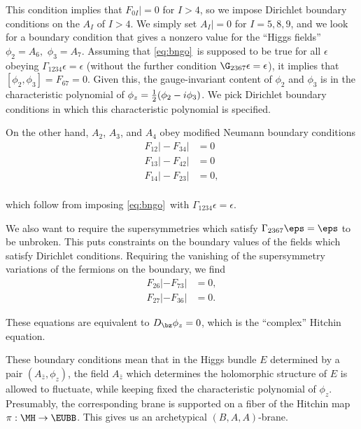 This condition implies that $F_{0I}|=0$ for $I>4$, so we impose
Dirichlet boundary conditions on the $A_I$ of $I>4$.  We simply
set $A_I\vert=0$ for $I=5,8,9$, and we look for a boundary
condition that gives a nonzero value for the ``Higgs fields''
$\phi_2=A_6,$ $\phi_3=A_7$.  Assuming that \eqref{eq:bngo}\ is supposed to
be true for all $\epsilon$ obeying
$\Gamma_{1234}\epsilon=\epsilon$ (without the further condition
$\G_{2367}\epsilon=\epsilon$), it implies that
$[\phi_2,\phi_3]=F_{67}=0$.  Given this, the gauge-invariant
content of $\phi_2$ and $\phi_3$ is in the characteristic
polynomial of $\phi_z={1\over 2}(\phi_2-i\phi_3)$.   We pick
Dirichlet boundary conditions in which this characteristic
polynomial is specified.

On the other hand, $A_{2}$, $A_{3}$, and $A_{4}$ obey modified
Neumann boundary conditions %
\setcounter{equation}{24}
\begin{equation}\label{eq:yimgo}
\begin{aligned} F_{12}\vert -
F_{34}\vert
 &=0\\
 F_{13}\vert - F_{42}\vert
 &=0\\
 F_{14}\vert - F_{23}\vert
 &=0,\\\end{aligned}
\end{equation}

 which follow from imposing \eqref{eq:bngo}\ with
 $\Gamma_{1234}\epsilon=\epsilon$.

We also want to require the supersymmetries which satisfy
$\Gamma_{2367}\eps=\eps$ to be unbroken. This puts constraints on
the boundary values of the fields which satisfy Dirichlet
conditions. Requiring the vanishing of the supersymmetry
variations of the fermions on the boundary, we find
\setcounter{equation}{25}
\begin{equation}\label{eq:dirbaa}
\begin{aligned}F_{26}|-F_{73}|&=0,\\ F_{27}|-F_{36}|&=0.\end{aligned}
\end{equation}

These equations are equivalent to $D_\bz\phi_z=0$, which is the
``complex'' Hitchin equation.

These boundary conditions mean that in the Higgs bundle $E$
determined by a pair $(A_{\bar z},\phi_z)$, the field $A_{\bar z}$
which determines the holomorphic structure of $E$ is allowed to
fluctuate, while keeping fixed the characteristic polynomial of
$\phi_z$.  Presumably, the corresponding brane is supported on a
fiber of the Hitchin map $\pi:\MH\to {\EUBB}$.  This gives us an
archetypical $(B,A,A)$-brane.

